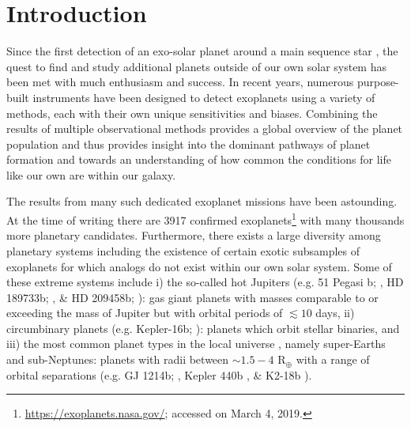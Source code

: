 \chapter{Introduction}

Since the first detection of an exo-solar planet around a main sequence star 
\citep{mayor95},
the quest to find and study additional planets outside of our own solar system 
has been met with much enthusiasm and success. In recent years, numerous 
purpose-built instruments
have been designed to detect exoplanets using a variety of methods, each with
their own unique sensitivities and biases. 
Combining the results of multiple observational methods provides a global overview
of the planet population and thus provides insight into
the dominant pathways of planet formation and towards an understanding of how
common the conditions for life like our own are within our galaxy.

The results from many such dedicated exoplanet missions have been 
astounding. At the time of writing there are 3917 confirmed 
exoplanets\footnote{\url{https://exoplanets.nasa.gov/}; accessed on March 4, 2019.} 
with many thousands more planetary candidates. Furthermore, there 
exists a large diversity among planetary systems including the existence 
of certain exotic subsamples of exoplanets for which analogs do not exist within 
our own solar system. Some of these extreme systems include i) the so-called hot 
Jupiters (e.g. 51 Pegasi b; \citealt{mayor95}, HD 189733b; \citealt{bouchy05}, 
\& HD 209458b; \citealt{mazeh99, charbonneau00}): 
gas giant planets with masses comparable to or exceeding the mass of Jupiter  
but with orbital periods of $\lesssim 10$ days, ii) circumbinary planets (e.g. 
Kepler-16b; \citealt{doyle11}): 
planets which orbit stellar binaries, and iii) the most common planet types
in the local universe \citep{petigura13}, namely super-Earths and sub-Neptunes:
planets with radii between $\sim 1.5-4$ R$_{\oplus}$ with a range of orbital separations
(e.g. GJ 1214b; \citealt{charbonneau09}, Kepler 440b \citealt{torres15}, \&
K2-18b \citealt{foremanmackey15,montet15}).


